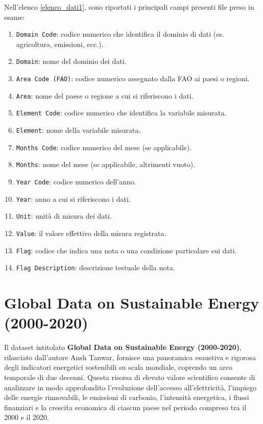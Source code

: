  Nell'elenco \ref{elenco_dati1}, sono riportati i principali campi presenti file preso in esame:
\vspace{2mm}
\begin{enumerate}
\label{elenco_dati1}
    \item \texttt{Domain Code}: codice numerico che identifica il dominio di dati (es. agricoltura, emissioni, ecc.).
    \item \texttt{Domain}: nome del dominio dei dati.
    \item \texttt{Area Code (FAO)}: codice numerico assegnato dalla FAO ai paesi o regioni.
    \item \texttt{Area}: nome del paese o regione a cui si riferiscono i dati.
    \item \texttt{Element Code}: codice numerico che identifica la variabile misurata.
    \item \texttt{Element}: nome della variabile misurata.
    \item \texttt{Months Code}: codice numerico del mese (se applicabile).
    \item \texttt{Months}: nome del mese (se applicabile, altrimenti vuoto).
    \item \texttt{Year Code}: codice numerico dell'anno.
    \item \texttt{Year}: anno a cui si riferiscono i dati.
    \item \texttt{Unit}: unità di misura dei dati.
    \item \texttt{Value}: il valore effettivo della misura registrata.
    \item \texttt{Flag}: codice che indica una nota o una condizione particolare sui dati.
    \item \texttt{Flag Description}: descrizione testuale della nota.
\end{enumerate}



\section{Global Data on Sustainable Energy (2000-2020)}

Il dataset intitolato \textbf{Global Data on Sustainable Energy (2000-2020)}, rilasciato dall'autore Ansh Tanwar, fornisce una panoramica esaustiva e rigorosa degli indicatori energetici sostenibili su scala mondiale, coprendo un arco temporale di due decenni. Questa risorsa di elevato valore scientifico consente di analizzare in modo approfondito l'evoluzione dell'accesso all'elettricità, l'impiego delle energie rinnovabili, le emissioni di carbonio, l'intensità energetica, i flussi finanziari e la crescita economica di ciascun paese nel periodo compreso tra il 2000 e il 2020.

